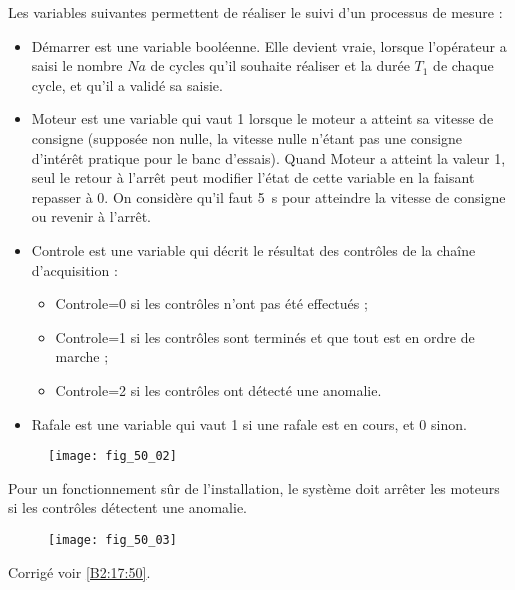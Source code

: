 Les variables suivantes permettent de réaliser le suivi d’un processus de mesure :
\begin{itemize}
\item Démarrer est une variable booléenne. Elle devient vraie, lorsque l’opérateur a saisi
le nombre $Na$ de cycles qu’il souhaite réaliser et la durée $T_1$ de chaque cycle, et
qu’il a validé sa saisie.
\item Moteur est une variable qui vaut 1 lorsque le moteur a atteint sa vitesse de consigne
(supposée non nulle, la vitesse nulle n’étant pas une consigne d’intérêt pratique
pour le banc d’essais). Quand Moteur a atteint la valeur 1, seul le retour à l’arrêt
peut modifier l’état de cette variable en la faisant repasser à 0. On considère qu’il
faut \SI{5}{s} pour atteindre la vitesse de consigne ou revenir à l’arrêt.
\item Controle est une variable qui décrit le résultat des contrôles de la chaîne d’acquisition
:
\begin{itemize}
\item Controle=0 si les contrôles n’ont pas été effectués ;
\item Controle=1 si les contrôles sont terminés et que tout est en ordre de marche ;
\item Controle=2 si les contrôles ont détecté une anomalie.
\end{itemize}
\item Rafale est une variable qui vaut 1 si une rafale est en cours, et 0 sinon.
\end{itemize}
\fi







\ifprof
\else
\fi

\ifprof
\else
\begin{figure}[H]
\centering
\texttt{[image: fig\_50\_02]}
\end{figure}

Pour un fonctionnement sûr de l’installation, le système doit arrêter les moteurs si les
contrôles détectent une anomalie.
\fi


\ifprof
\else
\begin{figure}[H]
\centering
\texttt{[image: fig\_50\_03]}
\end{figure}
\fi




\ifprof
\else
\begin{flushright}
\footnotesize{Corrigé  voir \ref{B2:17:50}.}
\end{flushright}%
\fi